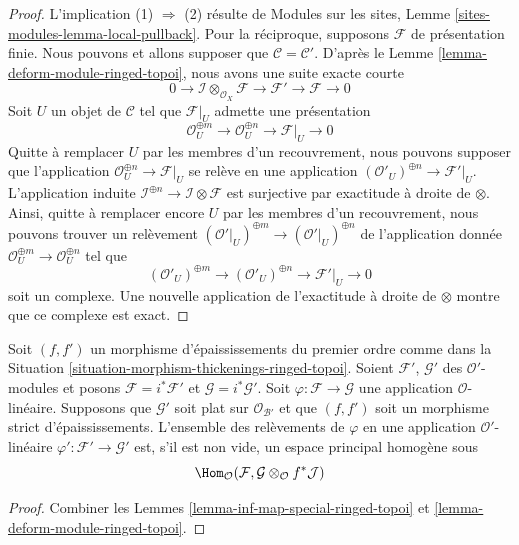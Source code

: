 \begin{proof}
L'implication (1) $\Rightarrow$ (2) résulte de Modules sur les sites,
Lemme \ref{sites-modules-lemma-local-pullback}.
Pour la réciproque, supposons $\mathcal{F}$ de présentation finie.
Nous pouvons et allons supposer que $\mathcal{C} = \mathcal{C}'$.
D'après le Lemme \ref{lemma-deform-module-ringed-topoi}, nous avons une suite
exacte courte
$$
0 \to \mathcal{I} \otimes_{\mathcal{O}_X} \mathcal{F} \to
\mathcal{F}' \to \mathcal{F} \to 0
$$
Soit $U$ un objet de $\mathcal{C}$ tel que $\mathcal{F}|_U$ admette une
présentation
$$
\mathcal{O}_U^{\oplus m} \to \mathcal{O}_U^{\oplus n} \to \mathcal{F}|_U \to 0
$$
Quitte à remplacer $U$ par les membres d'un recouvrement, nous pouvons
supposer que l'application $\mathcal{O}_U^{\oplus n} \to \mathcal{F}|_U$ se
relève en une application
$(\mathcal{O}'_U)^{\oplus n} \to \mathcal{F}'|_U$. L'application induite
$\mathcal{I}^{\oplus n} \to \mathcal{I} \otimes \mathcal{F}$ est surjective
par exactitude à droite de $\otimes$. Ainsi, quitte à remplacer encore $U$ par
les membres d'un recouvrement, nous pouvons trouver un relèvement
$(\mathcal{O}'|_U)^{\oplus m} \to (\mathcal{O}'|_U)^{\oplus n}$ de
l'application donnée
$\mathcal{O}_U^{\oplus m} \to \mathcal{O}_U^{\oplus n}$ tel que
$$
(\mathcal{O}'_U)^{\oplus m} \to (\mathcal{O}'_U)^{\oplus n} \to
\mathcal{F}'|_U \to 0
$$
soit un complexe. Une nouvelle application de l'exactitude à droite de
$\otimes$ montre que ce complexe est exact.
\end{proof}

\begin{lemma}
\label{lemma-inf-map-rel-ringed-topoi}
Soit $(f, f')$ un morphisme d'épaississements du premier ordre comme dans la
Situation \ref{situation-morphism-thickenings-ringed-topoi}.
Soient $\mathcal{F}'$, $\mathcal{G}'$ des $\mathcal{O}'$-modules et posons
$\mathcal{F} = i^*\mathcal{F}'$ et $\mathcal{G} = i^*\mathcal{G}'$.
Soit $\varphi : \mathcal{F} \to \mathcal{G}$ une application
$\mathcal{O}$-linéaire.
Supposons que $\mathcal{G}'$ soit plat sur
$\mathcal{O}_{\mathcal{B}'}$ et que $(f, f')$ soit un morphisme strict
d'épaississements.
L'ensemble des relèvements de $\varphi$ en une application
$\mathcal{O}'$-linéaire $\varphi' : \mathcal{F}' \to \mathcal{G}'$ est, s'il
est non vide, un espace principal homogène sous
$$
\Hom_\mathcal{O}(\mathcal{F},
\mathcal{G} \otimes_\mathcal{O} f^*\mathcal{J})
$$
\end{lemma}

\begin{proof}
Combiner les Lemmes \ref{lemma-inf-map-special-ringed-topoi} et
\ref{lemma-deform-module-ringed-topoi}.
\end{proof}

